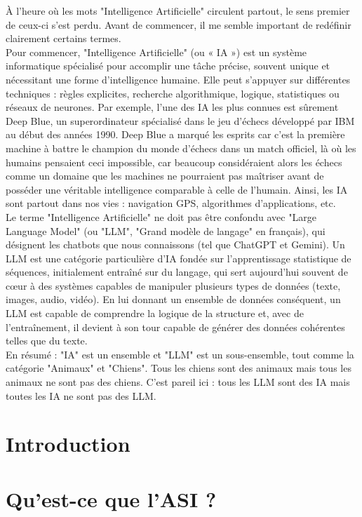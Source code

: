 \documentclass[12pt,a4paper]{article}
\begin{document}
À l'heure où les mots "Intelligence Artificielle" circulent partout, le sens premier de ceux-ci s'est perdu. Avant de commencer, il me semble important de redéfinir clairement certains termes.\\
Pour commencer, "Intelligence Artificielle" (ou « IA ») est un système informatique spécialisé pour accomplir une tâche précise, souvent unique et nécessitant une forme d'intelligence humaine. Elle peut s'appuyer sur différentes techniques : règles explicites, recherche algorithmique, logique, statistiques ou réseaux de neurones. Par exemple, l'une des IA les plus connues est sûrement Deep Blue, un superordinateur spécialisé dans le jeu d'échecs développé par IBM au début des années 1990. Deep Blue a marqué les esprits car c'est la première machine à battre le champion du monde d'échecs dans un match officiel, là où les humains pensaient ceci impossible, car beaucoup considéraient alors les échecs comme un domaine que les machines ne pourraient pas maîtriser avant de posséder une véritable intelligence comparable à celle de l'humain. Ainsi, les IA sont partout dans nos vies : navigation GPS, algorithmes d'applications, etc.\\
Le terme "Intelligence Artificielle" ne doit pas être confondu avec "Large Language Model" (ou "LLM", "Grand modèle de langage" en français), qui désignent les chatbots que nous connaissons (tel que ChatGPT et Gemini). Un LLM est une catégorie particulière d'IA fondée sur l'apprentissage statistique de séquences, initialement entraîné sur du langage, qui sert aujourd'hui souvent de cœur à des systèmes capables de manipuler plusieurs types de données (texte, images, audio, vidéo). En lui donnant un ensemble de données conséquent, un LLM est capable de comprendre la logique de la structure et, avec de l'entraînement, il devient à son tour capable de générer des données cohérentes telles que du texte.\\
En résumé : "IA" est un ensemble et "LLM" est un sous-ensemble, tout comme la catégorie "Animaux" et "Chiens". Tous les chiens sont des animaux mais tous les animaux ne sont pas des chiens. C'est pareil ici : tous les LLM sont des IA mais toutes les IA ne sont pas des LLM.

\section{Introduction}

\section{Qu'est-ce que l'ASI ?}
\end{document}
